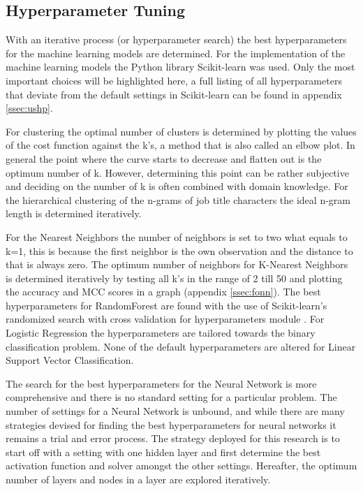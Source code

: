 
\subsection{Hyperparameter Tuning}
\label{ssec:ht}
With an iterative process (or hyperparameter search) the best hyperparameters for the machine learning models are determined. 
For the implementation of the machine learning models the Python library Scikit-learn was used.
Only the most important choices will be highlighted here, a full listing of all hyperparameters that deviate from the default settings in Scikit-learn can be found in appendix \ref{ssec:ushp}.

For clustering the optimal number of clusters is determined by plotting the values of the cost function against the k’s, a method that is also called an elbow plot.
In general the point where the curve starts to decrease and flatten out is the optimum number of k. 
However, determining this point can be rather subjective and deciding on the number of k is often combined with domain knowledge.
For the hierarchical clustering of the n-grams of job title characters the ideal n-gram length is determined iteratively. 

For the Nearest Neighbors the number of neighbors is set to two what equals to k=1, this is because the first neighbor is the own observation and the distance to that is always zero.
The optimum number of neighbors for K-Nearest Neighbors is determined iteratively by testing all k’s in the range of 2 till 50 and plotting the accuracy and MCC scores in a graph (appendix \ref{ssec:fonn}).
The best hyperparameters for RandomForest are found with the use of Scikit-learn’s randomized search with cross validation for hyperparameters module \cite{sklearn, bergstra2012random}.
For Logistic Regression the hyperparameters are tailored towards the binary classification problem. 
None of the default hyperparameters are altered for Linear Support Vector Classification. 

The search for the best hyperparameters for the Neural Network is more comprehensive and there is no standard setting for a particular problem. 
The number of settings for a Neural Network is unbound, and while there are many strategies devised for finding the best hyperparameters for neural networks \cite{larochelle2009exploring} it remains a trial and error process.
The strategy deployed for this research is to start off with a setting with one hidden layer and first determine the best activation function and solver amongst the other settings.
Hereafter, the optimum number of layers and nodes in a layer are explored iteratively.

